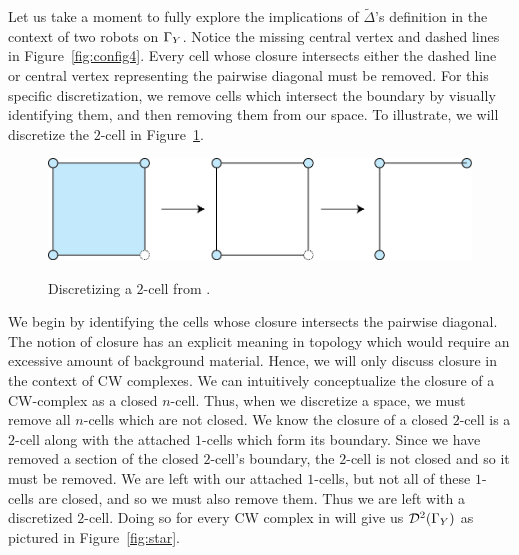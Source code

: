 Let us take a moment to fully explore the implications of $\tilde{\Delta}$'s definition in the context of two robots on $\Gamma_Y$. Notice the missing central vertex and dashed lines in Figure~\ref{fig:config4}. Every cell whose closure intersects either the dashed line or central vertex representing the pairwise diagonal must be removed. For this specific discretization, we remove cells which intersect the boundary by visually identifying them, and then removing them from our space. To illustrate, we will discretize the $2$-cell in Figure~\ref{fig:d_2cell}.

\begin{figure}[h]
\centering
\caption{Discretizing a $2$-cell from \C.}
\vspace{2mm}
\includegraphics[scale=.8]{2_Cell_Example.png}
\label{fig:d_2cell}
\end{figure}

We begin by identifying the cells whose closure intersects the pairwise diagonal. The notion of closure has an explicit meaning in topology which would require an excessive amount of background material. Hence, we will only discuss closure in the context of CW complexes. We can intuitively conceptualize the closure of a CW-complex as a closed $n$-cell. Thus, when we discretize a space, we must remove all $n$-cells which are not closed. We know the closure of a closed $2$-cell is a $2$-cell along with the attached $1$-cells which form its boundary. Since we have removed a section of the closed $2$-cell's boundary, the $2$-cell is not closed and so it must be removed. We are left with our attached $1$-cells, but not all of these $1$-cells are closed, and so we must also remove them. Thus we are left with a discretized $2$-cell. Doing so for every CW complex in \C will give us $\mathcal{D}^2(\Gamma_Y)$ as pictured in Figure~\ref{fig:star}.

